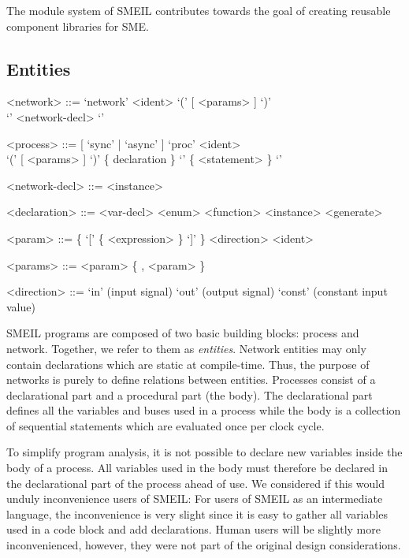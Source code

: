 The module system of SMEIL contributes towards the goal of creating reusable
component libraries for SME. 



\subsection{Entities}
\begin{grammar}
  <network> ::= `network' <ident> `(' [ <params> ] `)' \\`{' <network-decl> `}'

  <process> ::= [ `sync' | `async' ] `proc' <ident> \\ `(' [
             <params> ] `)' \{ declaration \} `{' \{ <statement> \} `}'

  <network-decl> ::= <instance>

  <declaration> ::= <var-decl>
  \alt <enum>
  \alt <function>
  \alt <instance>
  \alt <generate>
  
  <param> ::= \{ `[' \{ <expression> \} `]' \} <direction> <ident>

  <params> ::= <param> \{ , <param> \}

  <direction> ::= `in' (input signal)
  \alt `out' (output signal)
  \alt `const' (constant input value)  
\end{grammar}

SMEIL programs are composed of two basic building blocks: {\ttfamily
  process} and {\ttfamily network}. Together, we refer to them as {\itshape
  entities}. Network entities may only contain declarations which are static at
compile-time. Thus, the purpose of networks is purely to define relations
between entities.  Processes consist of a declarational part and a procedural
part (the body). The declarational part defines all the variables and buses used
in a process while the body is a collection of sequential statements which are
evaluated once per clock cycle.

To simplify program analysis, it is not possible to declare new variables inside
the body of a process. All variables used in the body must therefore be declared
in the declarational part of the process ahead of use. We considered if this
would unduly inconvenience users of SMEIL: For users of SMEIL as an intermediate
language, the inconvenience is very slight since it is easy to gather all
variables used in a code block and add declarations. Human users will be
slightly more inconvenienced, however, they were not part of the original design
considerations.

